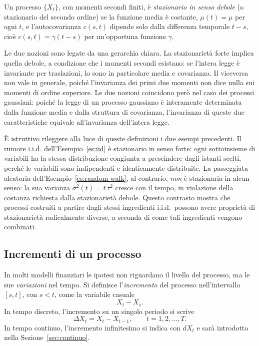 \begin{definition}
\label{def:stazionario-debole}
Un processo $\{X_t\}$, con momenti secondi finiti, \`{e}
\emph{stazionario in senso debole} (o stazionario del secondo ordine)
se la funzione media \`{e} costante, $\mu(t)=\mu$ per ogni $t$, e
l'autocovarianza $c(s,t)$ dipende solo dalla differenza temporale
$t-s$, cio\`{e} $c(s,t)=\gamma(t-s)$ per un'opportuna funzione
$\gamma$.
\end{definition}

Le due nozioni sono legate da una gerarchia chiara. La stazionariet\`{a}
forte implica quella debole, a condizione che i momenti secondi
esistano: se l'intera legge \`{e} invariante per traslazioni, lo sono
in particolare media e covarianza. Il viceversa non vale in generale,
poich\'{e} l'invarianza dei primi due momenti non dice nulla sui
momenti di ordine superiore. Le due nozioni coincidono per\`{o} nel
caso dei processi gaussiani: poich\'{e} la legge di un processo
gaussiano \`{e} interamente determinata dalla funzione media e dalla
struttura di covarianza, l'invarianza di queste due caratteristiche
equivale all'invarianza dell'intera legge.

\`{E} istruttivo rileggere alla luce di queste definizioni i due
esempi precedenti. Il rumore i.i.d. dell'Esempio~\ref{es:iid} \`{e}
stazionario in senso forte: ogni sottoinsieme di variabili ha la
stessa distribuzione congiunta a prescindere dagli istanti scelti,
perch\'{e} le variabili sono indipendenti e identicamente distribuite.
La passeggiata aleatoria dell'Esempio~\ref{es:random-walk}, al
contrario, \emph{non} \`{e} stazionaria in alcun senso: la sua
varianza $\sigma^2(t)=t\,\tau^2$ cresce con il tempo, in violazione
della costanza richiesta dalla stazionariet\`{a} debole. Questo
contrasto mostra che processi costruiti a partire dagli stessi
ingredienti i.i.d.\ possono avere propriet\`{a} di stazionariet\`{a}
radicalmente diverse, a seconda di come tali ingredienti vengono
combinati.

\subsection{Incrementi di un processo}

\noindent
In molti modelli finanziari le ipotesi non riguardano il livello del
processo, ma le sue \emph{variazioni} nel tempo. Si definisce
l'\emph{incremento} del processo nell'intervallo $[s,t]$, con $s<t$,
come la variabile casuale
\[
X_t-X_s.
\]
In tempo discreto, l'incremento su un singolo periodo si scrive
\[
\Delta X_t = X_t - X_{t-1}, \qquad t=1,2,\ldots,T.
\]
In tempo continuo, l'incremento infinitesimo si indica con $dX_t$ e
sar\`{a} introdotto nella Sezione~\ref{sec:continuo}.

